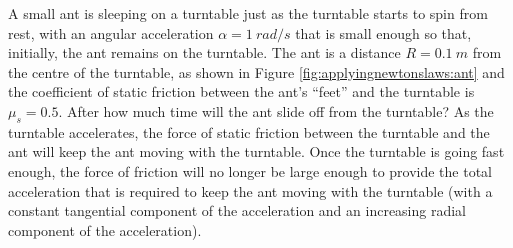 \begin{example}{
A small ant is sleeping on a turntable just as the turntable starts to spin from rest, with an angular acceleration $\alpha=\SI{1}{rad/s}$ that is small enough so that, initially, the ant remains on the turntable. The ant is a distance $R=\SI{0.1}{m}$ from the centre of the turntable, as shown in Figure \ref{fig:applyingnewtonslaws:ant}  and the coefficient of static friction between the ant's ``feet'' and the turntable is $\mu_s=0.5$. After how much time will the ant slide off from the turntable?}
As the turntable accelerates, the force of static friction between the turntable and the ant will keep the ant moving with the turntable. Once the turntable is going fast enough, the force of friction will no longer be large enough to provide the total acceleration that is required to keep the ant moving with the turntable (with a constant tangential component of the acceleration and an increasing radial component of the acceleration). 


\end{example}
